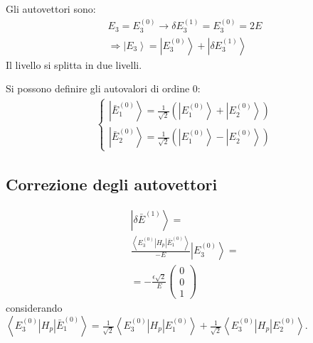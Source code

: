 Gli autovettori sono:
\begin{equation}\begin{split}
E_3=E_3^{\left(0\right)} \rightarrow \delta E_3^{\left(1\right)}=E_3^{\left(0\right)}=2E \\
\Longrightarrow \left |E_3 \right\rangle=\left |E_3^{\left(0\right)} \right\rangle+\left |\delta E_3^{\left(1\right)} \right\rangle
\end{split}\end{equation}
Il livello si splitta in due livelli.


Si possono definire gli autovalori di ordine $0$:
\begin{equation}\begin{split}
\begin{cases}
\left |\bar E_1^{\left(0\right)} \right\rangle=\frac{1}{\sqrt{2}}\left(\left |E_1^{\left(0\right)} \right\rangle+\left |E_2^{\left(0\right)} \right\rangle\right) \\
\left |\bar E_2^{\left(0\right)} \right\rangle=\frac{1}{\sqrt{2}}\left(\left |E_1^{\left(0\right)} \right\rangle-\left |E_2^{\left(0\right)} \right\rangle\right) 
\end{cases}
\end{split}\end{equation}

\subsection{Correzione degli autovettori} %
\begin{equation}\begin{split}
\left |\delta\bar E^{\left(1\right)} \right\rangle=\\
\frac{\left\langle E_3^{\left(0\right)}|H_p|\bar E_1^{\left(0\right)} \right\rangle}{-E}\left |E_3^{\left(0\right)} \right\rangle=\\
=-\frac{\epsilon\sqrt{2}}{E}\left(\begin{matrix}0\\0\\1\end{matrix}\right)
\end{split}\end{equation}
considerando $\left\langle E_3^{\left(0\right)}|H_p|\bar E_1^{\left(0\right)} \right\rangle=\frac{1}{\sqrt{2}}\left\langle E_3^{\left(0\right)}|H_p| E_1^{\left(0\right)} \right\rangle+\frac{1}{\sqrt{2}}\left\langle E_3^{\left(0\right)}|H_p| E_2^{\left(0\right)} \right\rangle$.

